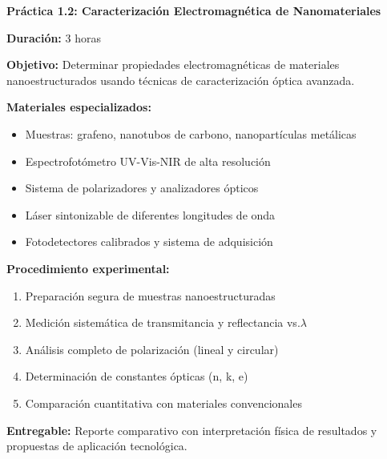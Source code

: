 \documentclass[12pt,a4paper]{book}
\begin{document}
\begin{practicabox}
\textbf{Práctica 1.2: Caracterización Electromagnética de Nanomateriales}

\textbf{Duración:} 3 horas

\textbf{Objetivo:} Determinar propiedades electromagnéticas de materiales nanoestructurados usando técnicas de caracterización óptica avanzada.

\textbf{Materiales especializados:}
\begin{itemize}
\item Muestras: grafeno, nanotubos de carbono, nanopartículas metálicas
\item Espectrofotómetro UV-Vis-NIR de alta resolución
\item Sistema de polarizadores y analizadores ópticos
\item Láser sintonizable de diferentes longitudes de onda
\item Fotodetectores calibrados y sistema de adquisición
\end{itemize}

\textbf{Procedimiento experimental:}
\begin{enumerate}
\item Preparación segura de muestras nanoestructuradas
\item Medición sistemática de transmitancia y reflectancia vs.$ \lambda$
\item Análisis completo de polarización (lineal y circular)
\item Determinación de constantes ópticas (n, k, e)
\item Comparación cuantitativa con materiales convencionales
\end{enumerate}

\textbf{Entregable:} Reporte comparativo con interpretación física de resultados y propuestas de aplicación tecnológica.
\end{practicabox}
\end{document}
